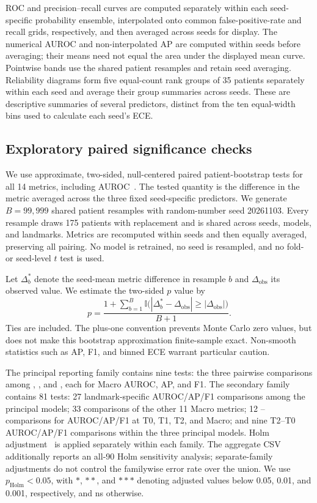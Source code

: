 ROC and precision--recall curves are computed separately within each seed-specific probability ensemble, interpolated onto common false-positive-rate and recall grids, respectively, and then averaged across seeds for display. The numerical AUROC and non-interpolated AP are computed within seeds before averaging; their means need not equal the area under the displayed mean curve. Pointwise bands use the shared patient resamples and retain seed averaging. Reliability diagrams form five equal-count rank groups of 35 patients separately within each seed and average their group summaries across seeds. These are descriptive summaries of several predictors, distinct from the ten equal-width bins used to calculate each seed's ECE.

\subsection{Exploratory paired significance checks}
We use approximate, two-sided, null-centered paired patient-bootstrap tests for all 14 metrics, including AUROC~\citep{davison1997}. The tested quantity is the difference in the metric averaged across the three fixed seed-specific predictors. We generate $B=99{,}999$ shared patient resamples with random-number seed 20261103. Every resample draws 175 patients with replacement and is shared across seeds, models, and landmarks. Metrics are recomputed within seeds and then equally averaged, preserving all pairing. No model is retrained, no seed is resampled, and no fold- or seed-level $t$ test is used.

Let $\Delta_b^*$ denote the seed-mean metric difference in resample $b$ and $\Delta_{\mathrm{obs}}$ its observed value. We estimate the two-sided $p$ value by
\begin{equation}
 p=\frac{1+\sum_{b=1}^{B}\mathbb{I}\bigl(|\Delta_b^*-\Delta_{\mathrm{obs}}|\geq|\Delta_{\mathrm{obs}}|\bigr)}{B+1}.
\end{equation}
Ties are included. The plus-one convention prevents Monte Carlo zero values, but does not make this bootstrap approximation finite-sample exact. Non-smooth statistics such as AP, F1, and binned ECE warrant particular caution.

The principal reporting family contains nine tests: the three pairwise comparisons among \nojepa{}, \direct{}, and \fullmodel{}, each for Macro AUROC, AP, and F1. The secondary family contains 81 tests: 27 landmark-specific AUROC/AP/F1 comparisons among the principal models; 33 comparisons of the other 11 Macro metrics; 12 \fullmodel{}--\meanmodel{} comparisons for AUROC/AP/F1 at T0, T1, T2, and Macro; and nine T2--T0 AUROC/AP/F1 comparisons within the three principal models. Holm adjustment~\citep{holm1979} is applied separately within each family. The aggregate CSV additionally reports an all-90 Holm sensitivity analysis; separate-family adjustments do not control the familywise error rate over the union. We use $p_{\mathrm{Holm}}<0.05$, with $*$, $**$, and $***$ denoting adjusted values below 0.05, 0.01, and 0.001, respectively, and ns otherwise.

